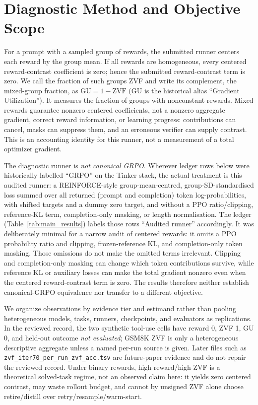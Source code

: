 \section{Diagnostic Method and Objective Scope}
\label{sec:diagnostic-method}

For a prompt with a sampled group of rewards, the submitted runner centers each
reward by the group mean. If all rewards are homogeneous, every centered
reward-contrast coefficient is zero; hence the submitted reward-contrast term
is zero. We call the fraction of such groups ZVF and write its complement, the
mixed-group fraction, as $\mathrm{GU}=1-\mathrm{ZVF}$ (GU is the historical alias
``Gradient Utilization''). It measures the fraction of groups with nonconstant rewards. Mixed rewards
guarantee nonzero centered coefficients, not a nonzero aggregate gradient,
correct reward information, or learning progress: contributions can cancel, masks
can suppress them, and an erroneous verifier can supply contrast. This is an
accounting identity for this runner, not a measurement of a total optimizer gradient.

The diagnostic runner is \emph{not canonical GRPO}. Wherever ledger rows below
were historically labelled ``GRPO'' on the Tinker stack, the actual treatment is
this audited runner: a REINFORCE-style group-mean-centred, group-SD-standardised
loss summed over all returned (prompt and completion) token log-probabilities,
with shifted targets and a dummy zero target, and without a PPO ratio/clipping,
reference-KL term, completion-only masking, or length normalisation. The ledger
(Table~\ref{tab:main_results}) labels those rows ``Audited runner'' accordingly. It was deliberately minimal
for a narrow audit of centered rewards: it omits a PPO probability ratio and
clipping, frozen-reference KL, and completion-only token masking. Those omissions
do not make the omitted terms irrelevant. Clipping and completion-only masking can
change which token contributions survive, while reference KL or auxiliary losses
can make the total gradient nonzero even when the centered reward-contrast term is
zero. The results therefore neither establish canonical-GRPO equivalence nor
transfer to a different objective.

We organize observations by evidence tier and estimand rather than pooling
heterogeneous models, tasks, runners, checkpoints, and evaluators as replications.
In the reviewed record, the two synthetic tool-use cells have reward 0, ZVF 1,
GU 0, and held-out outcome \emph{not evaluated}; GSM8K ZVF is only a heterogeneous
descriptive aggregate unless a named per-run source is given. Later files such as
\texttt{zvf\_iter70\_per\_run\_zvf\_acc.tsv} are future-paper evidence and do not
repair the reviewed record. Under binary rewards, high-reward/high-ZVF is a
theoretical solved-task regime, not an observed claim here: it yields zero centered
contrast, may waste rollout budget, and cannot by unsigned ZVF alone choose
retire/distill over retry/resample/warm-start.

